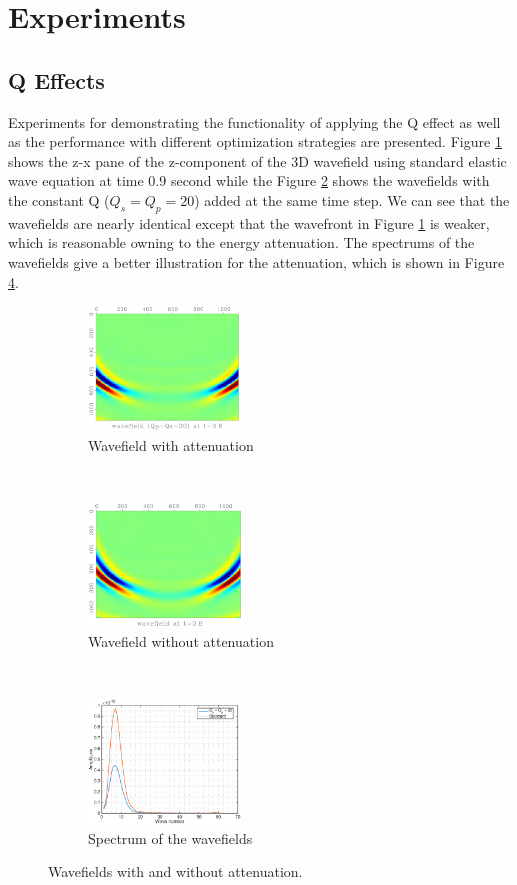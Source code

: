 \documentclass{paris17}
\begin{document}
\section{Experiments}

\subsection{Q Effects}
Experiments for demonstrating the functionality of applying the Q effect as well as  the performance with different optimization strategies are presented. Figure \ref{fig:with-attenuation} shows the z-x pane of the z-component of the 3D wavefield using standard elastic wave equation at time 0.9 second while the Figure \ref{fig:without-attenuation} shows the wavefields with the constant Q ($Q_s=Q_p=20$) added at the same time step. We can see that the wavefields are nearly identical except that the wavefront in Figure \ref{fig:with-attenuation} is weaker, which is reasonable owning to the energy attenuation. The spectrums of the wavefields give a better illustration for the attenuation, which is shown in Figure \ref{fig:spectrum}.

\begin{figure}[h]
    \centering
    \begin{subfigure}[b]{0.3\textwidth}
        \centering
        \includegraphics[height=1.3in]{./fig/q20.pdf}
        \caption{Wavefield with attenuation}
        \label{fig:with-attenuation}
    \end{subfigure}
    ~
    \begin{subfigure}[b]{0.3\textwidth}
        \centering
        \includegraphics[height=1.3in]{./fig/std.pdf}
        \caption{Wavefield without attenuation}
        \label{fig:without-attenuation}
    \end{subfigure}%
    ~
    \begin{subfigure}[b]{0.3\textwidth}
        \centering
        \includegraphics[height=1.3in]{./fig/spec.eps}
        \caption{Spectrum of the wavefields}
        \label{fig:spectrum}
    \end{subfigure}
    \caption{Wavefields with and without attenuation.}
\end{figure}
\end{document}
